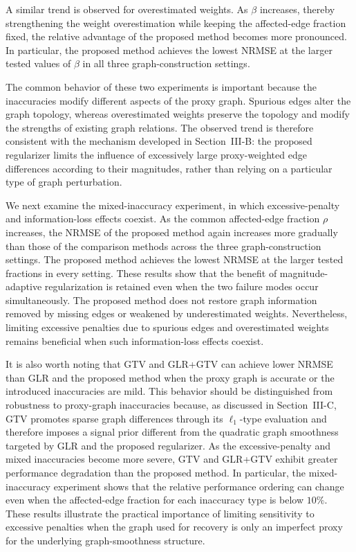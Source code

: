 A similar trend is observed for overestimated weights.
As $\beta$ increases, thereby strengthening the weight overestimation while keeping the affected-edge fraction fixed, the relative advantage of the proposed method becomes more pronounced.
In particular, the proposed method achieves the lowest NRMSE at the larger tested values of $\beta$ in all three graph-construction settings.

The common behavior of these two experiments is important because the inaccuracies modify different aspects of the proxy graph.
Spurious edges alter the graph topology, whereas overestimated weights preserve the topology and modify the strengths of existing graph relations.
The observed trend is therefore consistent with the mechanism developed in Section~III-B: the proposed regularizer limits the influence of excessively large proxy-weighted edge differences according to their magnitudes, rather than relying on a particular type of graph perturbation.

We next examine the mixed-inaccuracy experiment, in which excessive-penalty and information-loss effects coexist.
As the common affected-edge fraction $\rho$ increases, the NRMSE of the proposed method again increases more gradually than those of the comparison methods across the three graph-construction settings.
The proposed method achieves the lowest NRMSE at the larger tested fractions in every setting.
These results show that the benefit of magnitude-adaptive regularization is retained even when the two failure modes occur simultaneously.
The proposed method does not restore graph information removed by missing edges or weakened by underestimated weights.
Nevertheless, limiting excessive penalties due to spurious edges and overestimated weights remains beneficial when such information-loss effects coexist.

It is also worth noting that GTV and GLR+GTV can achieve lower NRMSE than GLR and the proposed method when the proxy graph is accurate or the introduced inaccuracies are mild.
This behavior should be distinguished from robustness to proxy-graph inaccuracies because, as discussed in Section~III-C, GTV promotes sparse graph differences through its $\ell_1$-type evaluation and therefore imposes a signal prior different from the quadratic graph smoothness targeted by GLR and the proposed regularizer.
As the excessive-penalty and mixed inaccuracies become more severe, GTV and GLR+GTV exhibit greater performance degradation than the proposed method.
In particular, the mixed-inaccuracy experiment shows that the relative performance ordering can change even when the affected-edge fraction for each inaccuracy type is below $10\%$.
These results illustrate the practical importance of limiting sensitivity to excessive penalties when the graph used for recovery is only an imperfect proxy for the underlying graph-smoothness structure.

